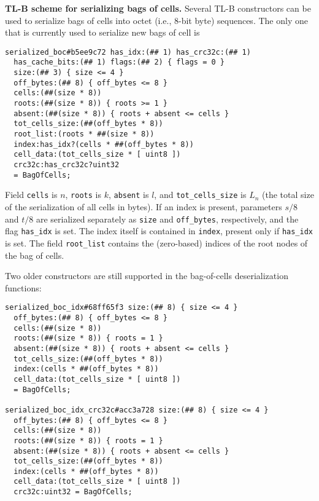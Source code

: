 \documentclass[12pt,oneside]{article}
\def\makepoint#1{\medbreak\noindent{\bf #1.\ }}
\def\nxsubpoint{\refstepcounter{subsubsection}%
  \smallbreak\makepoint{\thesubsubsection}}
\def\emb#1{\textbf{#1.}}
\begin{document}
\nxsubpoint\label{sp:boc.ser.sch}\emb{TL-B scheme for serializing bags of cells}
Several TL-B constructors can be used to serialize bags of cells into octet (i.e., 8-bit byte) sequences. The only one that is currently used to serialize new bags of cell is
\begin{verbatim}
serialized_boc#b5ee9c72 has_idx:(## 1) has_crc32c:(## 1) 
  has_cache_bits:(## 1) flags:(## 2) { flags = 0 }
  size:(## 3) { size <= 4 }
  off_bytes:(## 8) { off_bytes <= 8 } 
  cells:(##(size * 8)) 
  roots:(##(size * 8)) { roots >= 1 }
  absent:(##(size * 8)) { roots + absent <= cells }
  tot_cells_size:(##(off_bytes * 8))
  root_list:(roots * ##(size * 8))
  index:has_idx?(cells * ##(off_bytes * 8))
  cell_data:(tot_cells_size * [ uint8 ])
  crc32c:has_crc32c?uint32
  = BagOfCells;
\end{verbatim}
Field {\tt cells} is $n$, {\tt roots} is $k$, {\tt absent} is $l$, and {\tt tot\_cells\_size} is $L_n$ (the total size of the serialization of all cells in bytes). If an index is present, parameters $s/8$ and $t/8$ are serialized separately as {\tt size} and {\tt off\_bytes}, respectively, and the flag {\tt has\_idx} is set. The index itself is contained in {\tt index}, present only if {\tt has\_idx} is set. The field {\tt root\_list} contains the (zero-based) indices of the root nodes of the bag of cells.

Two older constructors are still supported in the bag-of-cells deserialization functions:
\begin{verbatim}
serialized_boc_idx#68ff65f3 size:(## 8) { size <= 4 }
  off_bytes:(## 8) { off_bytes <= 8 } 
  cells:(##(size * 8)) 
  roots:(##(size * 8)) { roots = 1 }
  absent:(##(size * 8)) { roots + absent <= cells }
  tot_cells_size:(##(off_bytes * 8))
  index:(cells * ##(off_bytes * 8))
  cell_data:(tot_cells_size * [ uint8 ])
  = BagOfCells;

serialized_boc_idx_crc32c#acc3a728 size:(## 8) { size <= 4 }
  off_bytes:(## 8) { off_bytes <= 8 } 
  cells:(##(size * 8)) 
  roots:(##(size * 8)) { roots = 1 }
  absent:(##(size * 8)) { roots + absent <= cells }
  tot_cells_size:(##(off_bytes * 8))
  index:(cells * ##(off_bytes * 8))
  cell_data:(tot_cells_size * [ uint8 ])
  crc32c:uint32 = BagOfCells;
\end{verbatim}
\end{document}
